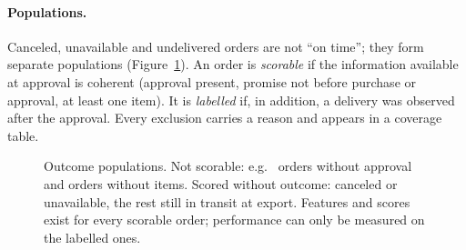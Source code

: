 \documentclass[10pt,twocolumn]{article}
\begin{document}
\paragraph{Populations.} Canceled, unavailable and undelivered orders are not ``on time''; they form
separate populations (Figure~\ref{fig:funnel}). An order is \emph{scorable} if the information
available at approval is coherent (approval present, promise not before purchase or approval, at least
one item). It is \emph{labelled} if, in addition, a delivery was observed after the approval. Every
exclusion carries a reason and appears in a coverage table.

\begin{figure}[t]
\centering
{}
\caption{Outcome populations. Not scorable: e.g.\ \WarnNoApproval{} orders without approval and orders
without items. Scored without outcome: \NScorableCanceled{} canceled or unavailable, the rest still in
transit at export. Features and scores exist for every scorable order; performance can only be measured
on the labelled ones.}
\label{fig:funnel}
\end{figure}

\end{document}

